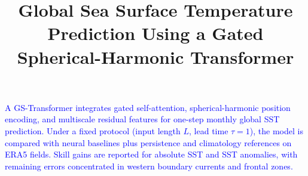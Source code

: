 \documentclass[published]{agujournal2025}
\newcommand{\rev}[1]{\textcolor{blue}{#1}}
\begin{document}
\linenumbers


\title{Global Sea Surface Temperature Prediction Using a Gated Spherical-Harmonic Transformer}





\keypoints%
    {\rev{A GS-Transformer integrates gated self-attention, spherical-harmonic position encoding, and multiscale residual features for one-step monthly global SST prediction.}}
    {\rev{Under a fixed protocol (input length $L$, lead time $\tau=1$), the model is compared with neural baselines plus persistence and climatology references on ERA5 fields.}}
    {\rev{Skill gains are reported for absolute SST and SST anomalies, with remaining errors concentrated in western boundary currents and frontal zones.}}


\maketitle
\end{document}

